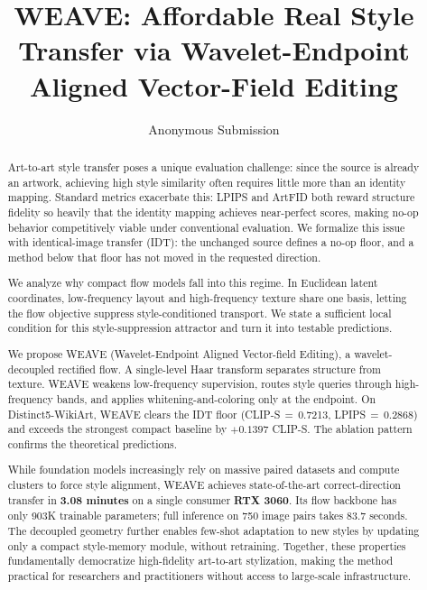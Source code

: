 \documentclass[letterpaper]{article}
\title{WEAVE: Affordable Real Style Transfer via Wavelet-Endpoint Aligned Vector-Field Editing }
\author{Anonymous Submission}
\begin{document}
\maketitle

\begin{abstract}
Art-to-art style transfer poses a unique evaluation challenge: since the source is already an artwork, achieving high style similarity often requires little more than an identity mapping.
Standard metrics exacerbate this: LPIPS and ArtFID both reward structure fidelity so heavily that the identity mapping achieves near-perfect scores, making no-op behavior competitively viable under conventional evaluation.
We formalize this issue with identical-image transfer (IDT): the unchanged source defines a no-op floor, and a method below that floor has not moved in the requested direction.

We analyze why compact flow models fall into this regime.
In Euclidean latent coordinates, low-frequency layout and high-frequency texture share one basis, letting the flow objective suppress style-conditioned transport.
We state a sufficient local condition for this style-suppression attractor and turn it into testable predictions.

We propose \textnormal{WEAVE} (Wavelet-Endpoint Aligned Vector-field Editing), a wavelet-decoupled rectified flow.
A single-level Haar transform separates structure from texture.
WEAVE weakens low-frequency supervision, routes style queries through high-frequency bands, and applies whitening-and-coloring only at the endpoint.
On Distinct5-WikiArt, WEAVE clears the IDT floor (CLIP-S\,$=$\,0.7213, LPIPS\,$=$\,0.2868) and exceeds the strongest compact baseline by $+0.1397$ CLIP-S.
The ablation pattern confirms the theoretical predictions.

While foundation models increasingly rely on massive paired datasets and compute clusters to force style alignment, WEAVE achieves state-of-the-art correct-direction transfer in \textbf{3.08 minutes} on a single consumer \textbf{RTX 3060}.
Its flow backbone has only 903K trainable parameters; full inference on 750 image pairs takes 83.7 seconds.
The decoupled geometry further enables few-shot adaptation to new styles by updating only a compact style-memory module, without retraining.
Together, these properties fundamentally democratize high-fidelity art-to-art stylization, making the method practical for researchers and practitioners without access to large-scale infrastructure.
\end{abstract}
\end{document}
